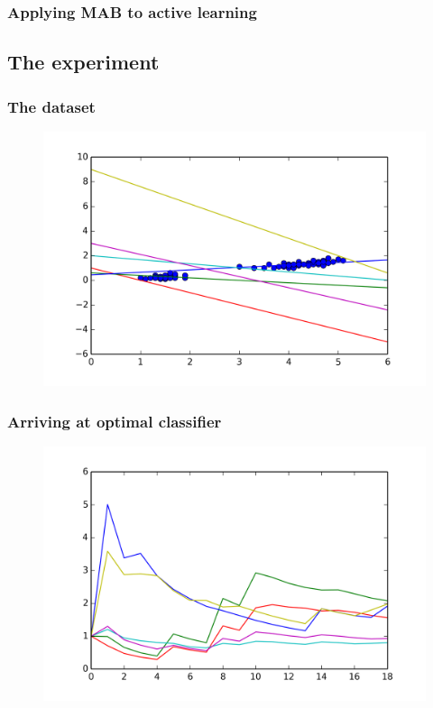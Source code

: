 \documentclass{beamer}
\begin{document}
  \begin{frame}
  \frametitle{Applying MAB to active learning}
  \end{frame}
\subsection{The experiment}
  \begin{frame}
  \frametitle{The dataset}
    \begin{figure}
      \includegraphics[scale=.7]{graphics/gypothesis} 
    \end{figure}
  \end{frame}
  \begin{frame}
  \frametitle{Arriving at optimal classifier}
    \begin{figure}
      \includegraphics[scale=.7]{graphics/convergence15} 
    \end{figure}
  \end{frame}
\end{document}
